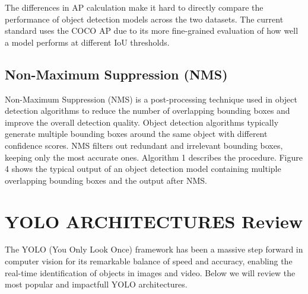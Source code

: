 \documentclass{article}
\begin{document}
The differences in AP calculation make it hard to directly compare the performance of object detection models across the two datasets. The current standard uses the COCO AP due to its more fine-grained evaluation of how well a model performs at different IoU thresholds.


\subsection{Non-Maximum Suppression (NMS)}

Non-Maximum Suppression (NMS) is a post-processing technique used in object detection algorithms to reduce the number of overlapping bounding boxes and improve the overall detection quality. Object detection algorithms typically generate multiple bounding boxes around the same object with different confidence scores. NMS filters out redundant and irrelevant bounding boxes, keeping only the most accurate ones. Algorithm 1 describes the procedure. Figure 4 shows the typical output of an object detection model containing multiple overlapping bounding boxes and the output after NMS.



\section{YOLO ARCHITECTURES Review}

The YOLO (You Only Look Once) framework has been a massive step forward in computer vision for its remarkable balance of speed and accuracy, enabling the real-time identification of objects in images and video. Below we will review the most popular and impactfull YOLO architectures.
\end{document}
